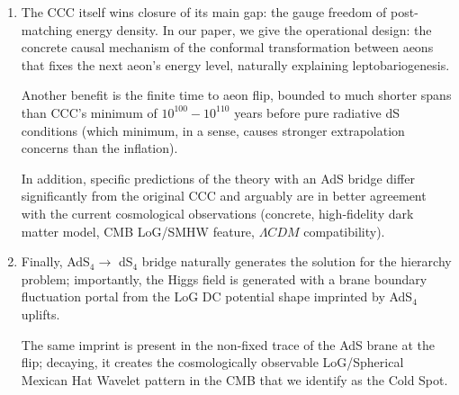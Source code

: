 \documentclass[10pt]{article}
\theoremstyle{definition}
\theoremstyle{plain}
\begin{document}
\begin{enumerate}
    The remarkable benefit of the AdS bridge for $\Lambda CDM$ is the \emph{explanation of cosmological constant} $\Lambda_4$ \emph{fine-tuning} through the limit-taking drive of $\Lambda_4 \uparrow 0^{-}$ interleaving with $\epsilon_\Lambda \rightarrow 0$  cutoff dynamics, with $\Lambda_4$ crosses zero exactly at the Universe origination.
    
    Another benefit for $\Lambda CDM$ is the natural DM explanation: it is ordinary matter with a probable large contribution of SMBH \emph{on the brane of the previous aeon}. Unlike the original CFT, our theory doesn't prescribe the full transformation of the previous aeon: once the new aeon brane is created by the flip, the old one continues to evolve by itself, being coupled to the other branes only gravitationally. 
    
    The dynamics of the proper brane separation due to the dS expansion fits to the difference in density parameters of early Universe and the corresponding Hubble tension.

    Taking into account the \emph{stack} of the shadow branes from the previous aeon, the theory naturally explains DM high-fidelity picture present in the dwarf cores distribution.
    
    \item The CCC itself wins closure of its main gap: the gauge freedom of post-matching energy density. In our paper, we give the operational design:  the concrete causal mechanism of the conformal transformation between aeons that fixes the next aeon's energy level, naturally explaining leptobariogenesis. 
    
    Another benefit is the finite time to aeon flip, bounded to much shorter spans than CCC's minimum of $10^{100}-10^{110}$ years before pure radiative dS conditions (which minimum, in a sense, causes stronger extrapolation concerns than the inflation). 
    
    In addition, specific predictions of the theory with an AdS bridge differ significantly from the original CCC and arguably are in better agreement with the current cosmological observations (concrete, high-fidelity dark matter model, CMB LoG/SMHW feature, $\Lambda CDM$ compatibility).
    \item Finally, AdS$_4 \rightarrow$ dS$_4$ bridge naturally generates the solution for the hierarchy problem; importantly, the Higgs field is generated with a brane boundary fluctuation portal from the LoG DC potential shape imprinted by AdS$_4$ uplifts. 
    
    The same imprint is present in the non-fixed trace of the AdS brane at the flip; decaying, it creates the cosmologically observable LoG/Spherical Mexican Hat Wavelet pattern in the CMB that we identify as the Cold Spot.
\end{enumerate}
\end{document}

